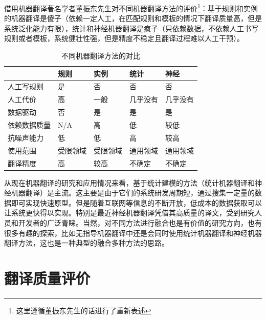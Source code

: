 \parinterval 借用机器翻译著名学者董振东先生对不同机器翻译方法的评价\footnote[1]{这里遵循董振东先生的话进行了重新表述}：基于规则和实例的机器翻译是傻子（依赖一定人工，在匹配规则和模板的情况下翻译质量高，但是系统泛化能力有限），统计和神经机器翻译是疯子（只依赖数据，不依赖人工书写规则或者模板，系统健壮性强，但是精度不稳定且翻译过程难以人工干预）。

\begin{table}[htp]{
\begin{center}
\caption{不同机器翻译方法的对比}
\label{tab:comparison-of-different-MT}
\begin{tabular}{l | l l l l}
& \parbox{3.8em}{规则} & \parbox{3.8em}{实例} & \parbox{3.8em}{统计} & \parbox{3.8em}
{神经} \\
\hline

人工写规则 & 是 & 否 & 否 & 否\\
人工代价 & 高 & 一般 & 几乎没有 & 几乎没有 \\
数据驱动 & 否 & 是 & 是 & 是\\
依赖数据质量 & N/A & 高 & 低 & 较低\\
抗噪声能力 & 低 & 低 & 高 & 较高 \\
使用范围 & 受限领域 & 受限领域 & 通用领域 & 通用领域 \\
翻译精度 & 高 & 较高 & 不确定 & 不确定 \\
\end{tabular}
\end{center}
\label{tab:1-1}
}\end{table}

\parinterval 从现在机器翻译的研究和应用情况来看，基于统计建模的方法（统计机器翻译和神经机器翻译）是主流。这主要是由于它们的系统研发周期短，通过搜集一定量的数据即可实现快速原型。但是随着互联网等信息的不断开放，低成本的数据获取可以让系统更快得以实现。特别是最近神经机器翻译凭借其高质量的译文，受到研究人员和开发者的广泛青睐。当然，对不同方法进行融合也是有价值的研究方向，也有很多有趣的探索，比如无指导机器翻译中还是会同时使用统计机器翻译和神经机器翻译方法，这也是一种典型的融合多种方法的思路。


\sectionnewpage
\section{翻译质量评价}

